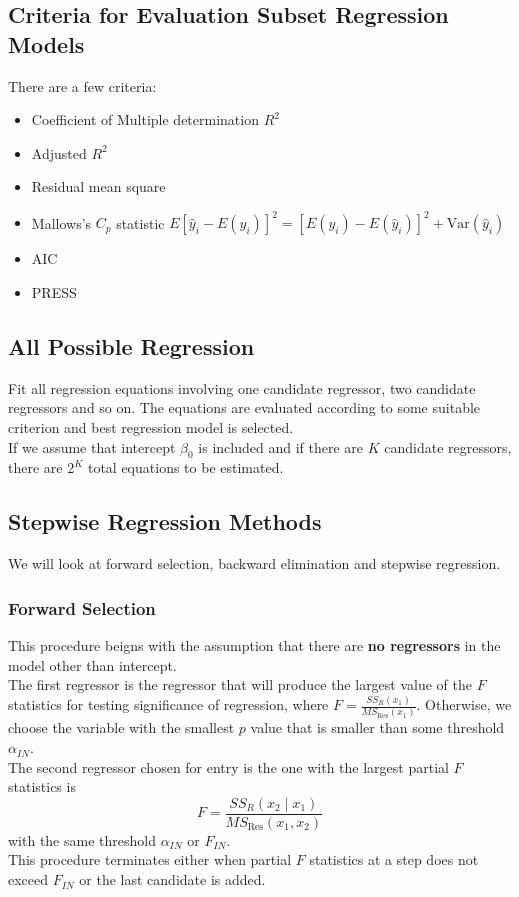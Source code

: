 \documentclass[11pt]{article}
\newcommand{\var}{\mathrm{Var}}
\theoremstyle{definition}
\begin{document}
\subsection{Criteria for Evaluation Subset Regression Models}
There are a few criteria:
\begin{itemize}
  \item Coefficient of Multiple determination $R^2$
  \item Adjusted $R^2$
  \item Residual mean square
  \item Mallows's $C_p$ statistic $E[\hat{y}_i-E(y_i)]^2=[E(y_i)-E(\hat{y}_i)]^2+\var(\hat{y}_i)$
  \item AIC
  \item PRESS
\end{itemize}
\subsection{All Possible Regression}
Fit all regression equations involving one candidate regressor, two candidate regressors and so on. The equations are evaluated according to some suitable criterion and best regression model is selected.\\
If we assume that intercept $\beta_0$ is included and if there are $K$ candidate regressors, there are $2^K$ total equations to be estimated.
\subsection{Stepwise Regression Methods}
We will look at forward selection, backward elimination and stepwise regression.
\subsubsection{Forward Selection}
This procedure beigns with the assumption that there are \textbf{no regressors} in the model other than intercept.\\
The first regressor is the regressor that will produce the largest value of the $F$ statistics for testing significance of regression, where $F=\frac{SS_R(x_1)}{MS_\text{Res}(x_1)}$. Otherwise, we choose the variable with the smallest $p$ value that is smaller than some threshold $\alpha_{IN}$.\\
The second regressor chosen for entry is the one with the largest partial $F$ statistics is
\[
F=\frac{SS_R(x_2\mid x_1)}{MS_\text{Res}(x_1,x_2)}
\]
with the same threshold $\alpha_{IN}$ or $F_{IN}$.\\
This procedure terminates either when partial $F$ statistics at a step does not exceed $F_{IN}$ or the last candidate is added.
\end{document}
